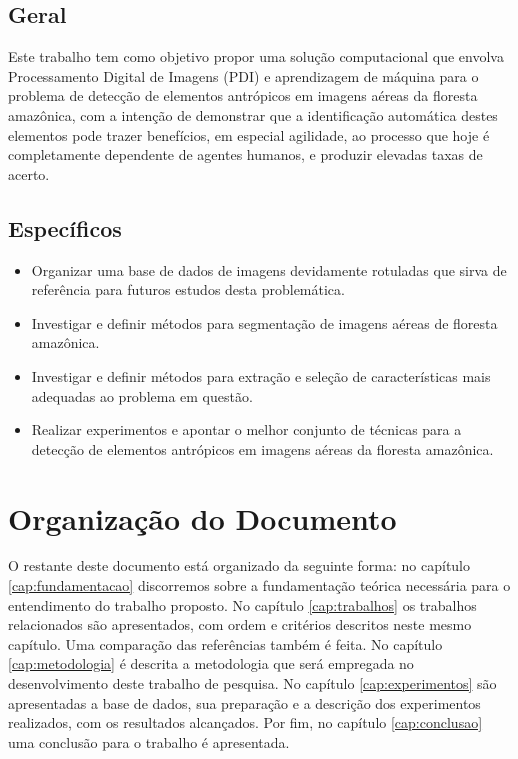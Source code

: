 \subsection{Geral}

Este trabalho tem como objetivo propor uma solução computacional que envolva Processamento Digital de Imagens (PDI) e aprendizagem de máquina para o problema de detecção de elementos antrópicos em imagens aéreas da floresta amazônica, com a intenção de demonstrar que a identificação automática destes elementos pode trazer benefícios, em especial agilidade, ao processo que hoje é completamente dependente de agentes humanos, e produzir elevadas taxas de acerto.

\subsection{Específicos}

\begin{itemize}
    \item Organizar uma base de dados de imagens devidamente rotuladas que sirva de referência para futuros estudos desta problemática.
    \item Investigar e definir métodos para segmentação de imagens aéreas de floresta amazônica.
    \item Investigar e definir métodos para extração e seleção de características mais adequadas ao problema em questão.
    \item Realizar experimentos e apontar o melhor conjunto de técnicas para a detecção de elementos antrópicos em imagens aéreas da floresta amazônica.
\end{itemize}

\section{Organização do Documento}

O restante deste documento está organizado da seguinte forma: no capítulo \ref{cap:fundamentacao} discorremos sobre a fundamentação teórica necessária para o entendimento do trabalho proposto. No capítulo \ref{cap:trabalhos} os trabalhos relacionados são apresentados, com ordem e critérios descritos neste mesmo capítulo. Uma comparação das referências também é feita. No capítulo \ref{cap:metodologia} é descrita a metodologia que será empregada no desenvolvimento deste trabalho de pesquisa. No capítulo \ref{cap:experimentos} são apresentadas a base de dados, sua preparação e a descrição dos experimentos realizados, com os resultados alcançados. Por fim, no capítulo \ref{cap:conclusao} uma conclusão para o trabalho é apresentada.

